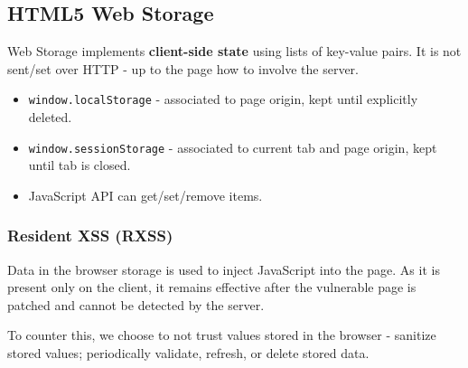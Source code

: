 \documentclass[11pt]{article}
\begin{document}
\subsection{HTML5 Web Storage}
Web Storage implements \textbf{client-side state} using lists of key-value pairs.
It is not sent/set over HTTP - up to the page how to involve the server.
\begin{itemize}
  \item \texttt{window.localStorage} - associated to page origin, kept until explicitly deleted.
  \item \texttt{window.sessionStorage} - associated to current tab and page origin, kept until tab is closed.
  \item JavaScript API can get/set/remove items.
\end{itemize}

\subsubsection{Resident XSS (RXSS)}
Data in the browser storage is used to inject JavaScript into the page.
As it is present only on the client, it remains effective after the vulnerable page is patched and cannot be detected by the server.

To counter this, we choose to not trust values stored in the browser - sanitize stored values; periodically validate, refresh, or delete stored data.
\end{document}
